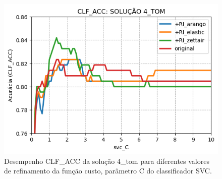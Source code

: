\begin{figure}[h]
    \centering
    \caption{Desempenho CLF\_ACC da solução 4\_tom para diferentes valores de refinamento da função custo, parâmetro C do classificador SVC.}
    \vspace{-0.5cm}
    \begin{center}
        \includegraphics[scale=0.75]{img/clf-acc-4-tom.png}
    \end{center}
    \vspace{-0.5cm}
    \label{fig:clf-acc-4-tom}
\end{figure}